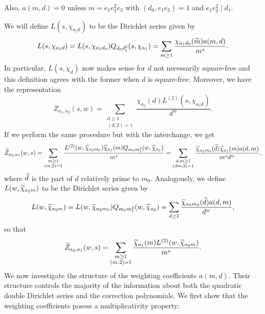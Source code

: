 \documentclass[12pt,reqno,oneside]{amsart}
\begin{document}
    \begin{remark}\label{rem:weighting_coefficient_remark}
        Also, $a(m,d) = 0$ unless $m = e_{1}e_{2}^{2}e_{3}$ with $(d_{0},e_{1}e_{3}) = 1$ and $e_{1}e_{2}^{2} \mid d_{1}$.
    \end{remark}

    We will define $L(s,\chi_{a_{1}d})$ to be the Dirichlet series given by
    \[
        L(s,\chi_{a_{1}d}) = L(s,\chi_{a_{1}d_{0}})Q_{d_{0}d_{1}^{2}}(s,\chi_{a_{1}}) = \sum_{m \ge 1}\frac{\chi_{a_{1}d_{0}}(\widehat{m})a(m,d)}{m^{s}}.
    \]
    In particular, $L(s,\chi_{d})$ now makes sense for $d$ not necessarily square-free and this definition agrees with the former when $d$ is square-free. Moreover, we have the representation
    \[
        Z_{a_{1},a_{2}}(s,w) = \sum_{\substack{d \ge 1 \\ (d,2) = 1}}\frac{\chi_{a_{2}}(d)L^{(2)}(s,\chi_{a_{1}d})}{d^{w}}.
    \]
    If we perform the same procedure but with the interchange, we get
    \[
        \widetilde{Z}_{a_{2},a_{1}}(w,s) = \sum_{\substack{m \ge 1 \\ (m,2) = 1}}\frac{L^{(2)}(w,\widetilde{\chi}_{a_{2}m_{0}})\widetilde{\chi}_{a_{1}}(m)Q_{m_{0}m_{1}^{2}}(w,\widetilde{\chi}_{a_{2}})}{m^{s}} = \sum_{\substack{d,m \ge 1 \\ (dm,2) = 1}}\frac{\widetilde{\chi}_{a_{2}m_{0}}(\widehat{d})\widetilde{\chi}_{a_{1}}(m)a(d,m)}{m^{s}d^{w}},
    \]
    where $\widehat{d}$ is the part of $d$ relatively prime to $m_{0}$. Analogously, we define $L(w,\widetilde{\chi}_{a_{2}m})$ to be the Dirichlet series given by
    \[
        L(w,\widetilde{\chi}_{a_{2}m}) = L(w,\widetilde{\chi}_{a_{2}m_{0}})Q_{m_{0}m_{1}^{2}}(w,\widetilde{\chi}_{a_{2}}) = \sum_{d \ge 1}\frac{\widetilde{\chi}_{a_{2}m_{0}}(\widehat{d})a(d,m)}{d^{w}},
    \]
    so that
    \[
        \widetilde{Z}_{a_{2},a_{1}}(w,s) = \sum_{\substack{m \ge 1 \\ (m,2) = 1}}\frac{\widetilde{\chi}_{a_{1}}(m)L^{(2)}(w,\widetilde{\chi}_{a_{2}m})}{m^{s}}.
    \]
    We now investigate the structure of the weighting coefficients $a(m,d)$. Their structure controls the majority of the information about both the quadratic double Dirichlet series and the correction polynomials. We first show that the weighting coefficients posess a multiplicativity property:
\end{document}
